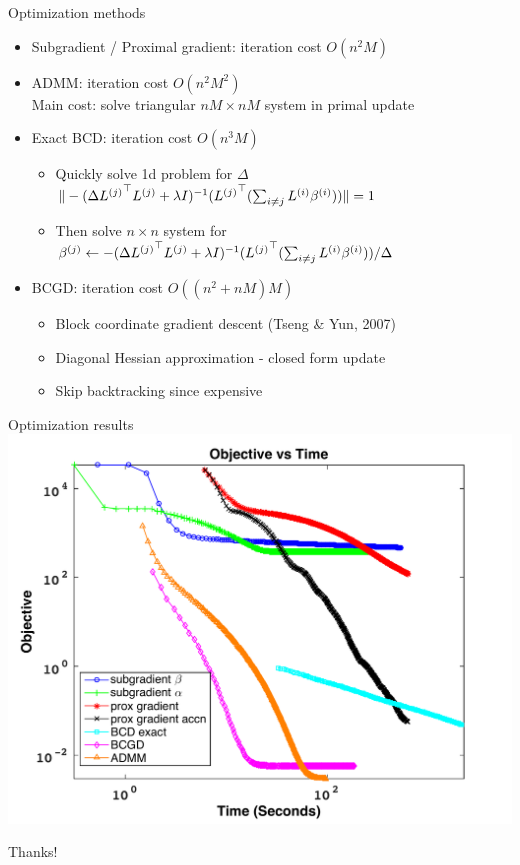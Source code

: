 \begin{frame}{Optimization methods}
\begin{itemize}
\item Subgradient / Proximal gradient: iteration cost $O(n^2M)$
\item ADMM: iteration cost $O(n^2M^2)$ \\
Main cost: solve triangular $nM \times nM$ system in primal update
\pause
\item Exact BCD: iteration cost $O(n^3 M)$ \\
\begin{itemize}
\item Quickly solve 1d problem for $\Delta$
$\|-(\Delta {L^{(j)}}^\top{L^{(j)}} + \lambda I)^{-1}({L^{(j)}}^\top (\sum_{i\neq j}{L^{(i)}} {\beta^{(i)}}))\|=1$
\item Then solve $n \times n$ system for 
${\beta^{(j)}} \leftarrow -(\Delta {L^{(j)}}^\top{L^{(j)}}+\lambda I)^{-1}({L^{(j)}}^\top(\sum_{i\neq j}{L^{(i)}} {\beta^{(i)}}))/\Delta$
\end{itemize}
\pause
\item BCGD: iteration cost $O((n^2+nM)M)$
\begin{itemize}
\item Block coordinate gradient descent (Tseng \& Yun, 2007) 
\item Diagonal Hessian approximation - closed form update
\item Skip backtracking since expensive
\end{itemize}
\end{itemize}
\end{frame}

\begin{frame}{Optimization results}
\includegraphics[width=\textwidth]{figs/time1000v2}
\end{frame}

\begin{frame}{}
\begin{center}
Thanks!
\end{center}
\end{frame}
